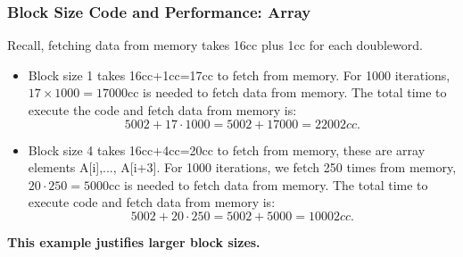 {%
\begin{frame}[fragile]\frametitle{Block Size Code and Performance: Array}
Recall, fetching data from memory takes 16cc plus 1cc for each doubleword.
\begin{itemize}
\item Block size 1 takes 16cc+1cc=17cc to fetch from memory. For 1000 iterations, $17\times 1000=17000$cc is needed to fetch data from memory. The total time to execute the code and fetch data from memory is:
$$5002+17 \cdot 1000 = 5002 + 17000 = 22002cc.$$
\item Block size 4 takes 16cc+4cc=20cc to fetch from memory, these are array elements A[i],..., A[i+3]. For 1000 iterations, we fetch 250 times from memory, $20\cdot 250=5000$cc is needed to fetch data from memory. The total time to execute code and fetch data from memory is:
$$5002+ 20\cdot 250 = 5002 + 5000 = 10002cc.$$
\end{itemize}
\textbf{This example justifies larger block sizes.}
\end{frame}
}\fi



